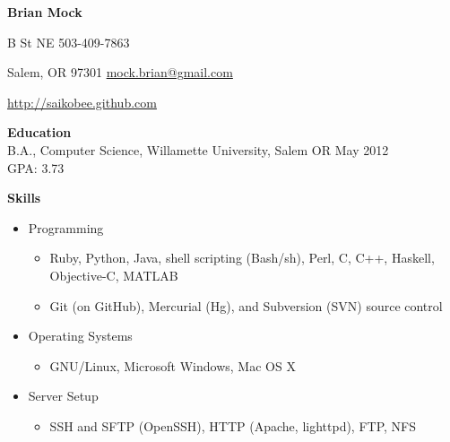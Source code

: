 \documentclass[10pt]{article}
\begin{document}
\noindent
\begin{center}
\textbf{\Large Brian Mock}
\end{center}

 B St NE
\hfill
503-409-7863

\noindent
Salem, OR 97301
\hfill
\url{mock.brian@gmail.com}

\noindent
\hfill
\url{http://saikobee.github.com}

\bigskip
\smallskip

\medskip
\noindent \textbf{Education} \hrulefill \\
\hangindent=24pt
B.A., Computer Science, Willamette University, Salem OR
May 2012 \\
GPA: 3.73

\noindent \textbf{Skills} \hrulefill
\begin{itemize}
\item Programming
    \begin{itemize}
    \item Ruby, Python, Java, shell scripting (Bash/sh), Perl, C, C++,
    Haskell, Objective-C, MATLAB
    \item Git (on GitHub), Mercurial (Hg), and Subversion (SVN) source control
    \end{itemize}
\item Operating Systems
    \begin{itemize}
    \item GNU/Linux, Microsoft Windows, Mac OS X
    \end{itemize}
\item Server Setup
    \begin{itemize}
    \item SSH and SFTP (OpenSSH), HTTP (Apache, lighttpd), FTP, NFS
    \end{itemize}
\end{itemize}
\end{document}
